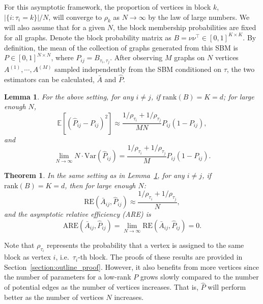 \documentclass[journal,twoside,web]{ieeecolor}
\newtheorem{lemma}[fact]{Lemma}
\newtheorem{theorem}[fact]{Theorem}
\newcommand{\Ex}{\mathbb{E}}
\begin{document}
For this asymptotic framework, 
the proportion of vertices in block $k$, $|\{i:\tau_i=k\}|/N$, will converge to $\rho_k$ as $N\to\infty$ by the law of large numbers.
We will also assume that for a given $N$, the block membership probabilities are fixed for all graphs.
Denote the block probability matrix as $B = \nu \nu^{\top} \in [0, 1]^{K \times K}$.
By definition, the mean of the collection of graphs generated from this SBM is $P \in [0, 1]^{N \times N}$, where $P_{ij} = B_{\tau_i, \tau_j}$. After observing $M$ graphs on $N$ vertices $A^{(1)}, \cdots, A^{(M)}$ sampled independently from the SBM conditioned on $\tau$, the two estimators can be calculated, $\bar{A}$ and $\hat{P}$.

\begin{lemma}
\label{lm:VarPhat}
For the above setting, for any $i \ne j$, if $\mathrm{rank}(B)=K=d$; for large enough $N$,
\[
    \Ex[(\hat{P}_{ij} - P_{ij})^2] \approx
    \frac{1/\rho_{\tau_i} + 1/\rho_{\tau_j}}{M N} P_{ij}(1-P_{ij}),
\]
and
\[
    \lim_{N \to \infty} N \cdot \mathrm{Var}(\hat{P}_{ij}) =
    \frac{1/\rho_{\tau_i} + 1/\rho_{\tau_j}}{M} P_{ij} (1 - P_{ij}).
\]
\end{lemma}


\begin{theorem}
\label{thm:ARE}
In the same setting as in Lemma~\ref{lm:VarPhat}, for any $i \ne j$, if $\mathrm{rank}(B)=K=d$, then for large enough $N$:
\begin{equation}
	    \mathrm{RE}(\bar{A}_{ij}, \hat{P}_{ij}) \approx
    \frac{1/\rho_{\tau_i} + 1/\rho_{\tau_j}}{N},
\label{eq:approx_re}
\end{equation}
and the asymptotic relative efficiency (ARE) is
\[
    \mathrm{ARE}(\bar{A}_{ij}, \hat{P}_{ij}) = \lim_{N \to \infty} \mathrm{RE}(\bar{A}_{ij}, \hat{P}_{ij}) = 0.
    \label{eq:sbm_are}
\]
\end{theorem}

Note that $\rho_{\tau_i}$ represents the probability that a vertex is assigned to the same block as vertex $i$, i.e.\ $\tau_i$-th block.
The proofs of these results are provided in Section~\ref{section:outline_proof}. 
However, it also benefits from more vertices since the number of parameters for a low-rank $P$ grows slowly compared to the number of potential edges as the number of vertices increases. That is, $\hat{P}$ will perform better as the number of vertices $N$ increases.
\end{document}
